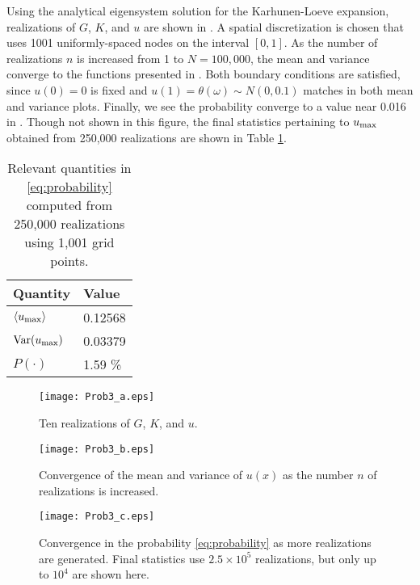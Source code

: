 \documentclass[11pt]{article}
\begin{document}
Using the analytical eigensystem solution for the Karhunen-Loeve expansion, realizations of $G$, $K$, and $u$ are shown in . A spatial discretization is chosen that uses 1001 uniformly-spaced nodes on the interval $[0,1]$. As the number of realizations $n$ is increased from 1 to $N=100,\!000$, the mean and variance converge to the functions presented in . Both boundary conditions are satisfied, since $u(0)=0$ is fixed and  $u(1) = \theta(\omega) \sim N(0,0.1)$ matches in both mean and variance plots. Finally, we see the probability converge to a value near 0.016 in . Though not shown in this figure, the final statistics pertaining to $u_{\text{max}}$ obtained from 250,000 realizations are shown in Table \ref{tbl:probabilities}.

\vspace{2in}
\begin{table}[h]
\centering
\begin{tabular}{ll}
\toprule
Quantity & Value \\
\midrule
$\left\langle u_{\text{max}} \right\rangle$ & 0.12568 \\
$\operatorname{Var}(u_{\text{max}})$ & 0.03379 \\
$P(\cdot)$ & 1.59 \% \\
\bottomrule
\end{tabular}
\vspace{1em}
\caption{Relevant quantities in \eqref{eq:probability} computed from 250,000 realizations using 1,001 grid points.}
\label{tbl:probabilities}
\end{table}

\begin{figure}[t]
\centering
\texttt{[image: Prob3\_a.eps]}
\caption{Ten realizations of $G$, $K$, and $u$.}
\label{fig:prob3a}
\end{figure}

\begin{figure}[b]
\centering
\texttt{[image: Prob3\_b.eps]}
\caption{Convergence of the mean and variance of $u(x)$ as the number $n$ of realizations is increased.}
\label{fig:prob3b}
\end{figure}

\begin{figure}[t]
\centering
\texttt{[image: Prob3\_c.eps]}
\vspace{1em}
\caption{Convergence in the probability \eqref{eq:probability} as more realizations are generated. Final statistics use $2.5\times 10^5$ realizations, but only up to $10^4$ are shown here.}
\label{fig:prob3c}
\end{figure}

\end{document}
